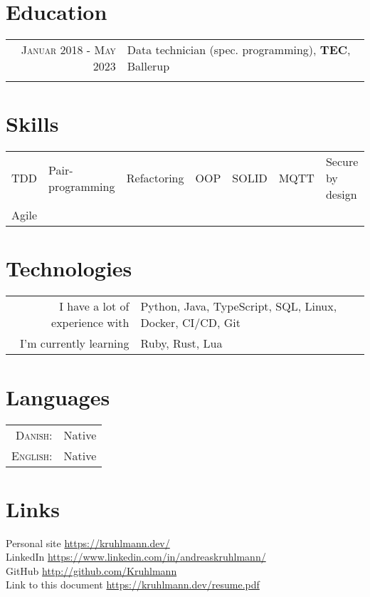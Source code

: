 \documentclass[a4paper,10pt]{article}
\begin{document}
\section{Education}
\begin{tabular}{rl}	
    \textsc{Januar 2018 - May 2023} & Data technician (spec. programming), \textbf{TEC}, Ballerup\\ & \\
\end{tabular}

\section{Skills}
\begin{tabular}{lllllll}
    TDD & Pair-programming & Refactoring & OOP & SOLID & MQTT & Secure by design\\
    Agile \\
\end{tabular}

\section{Technologies}
\begin{tabular}{rl}
    I have a lot of experience with & Python, Java, TypeScript, SQL, Linux, Docker, CI/CD, Git \\
    I'm currently learning & Ruby, Rust, Lua \\
\end{tabular}

\section{Languages}
\begin{tabular}{rl}
 \textsc{Danish:}&Native\\
\textsc{English:}&Native\\
\end{tabular}

\section{Links}
Personal site \href{https://kruhlmann.dev/}{https://kruhlmann.dev/}\\
LinkedIn \href{https://www.linkedin.com/in/andreaskruhlmann/}{https://www.linkedin.com/in/andreaskruhlmann/}\\
GitHub  \href{https://github.com/Kruhlmann}{http://github.com/Kruhlmann} \\
Link to this document \href{https://kruhlmann.dev/resume.pdf}{https://kruhlmann.dev/resume.pdf}\\
\end{document}
